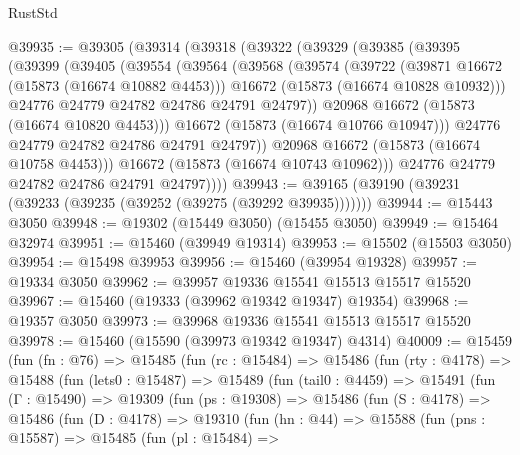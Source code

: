 \begin{lexlean}{RustStd}
\begin{coremodule}
@39935 := @39305
    (@39314
      (@39318
        (@39322
          (@39329
            (@39385
              (@39395
                (@39399
                  (@39405
                    (@39554
                      (@39564
                        (@39568
                          (@39574
                            (@39722
                              (@39871 @16672 (@15873 (@16674 @10882 @4453)))
                              @16672
                              (@15873 (@16674 @10828 @10932)))
                            @24776
                            @24779
                            @24782
                            @24786
                            @24791
                            @24797))
                        @20968
                        @16672
                        (@15873 (@16674 @10820 @4453)))
                      @16672
                      (@15873 (@16674 @10766 @10947)))
                    @24776
                    @24779
                    @24782
                    @24786
                    @24791
                    @24797))
                @20968
                @16672
                (@15873 (@16674 @10758 @4453)))
              @16672
              (@15873 (@16674 @10743 @10962)))
            @24776
            @24779
            @24782
            @24786
            @24791
            @24797))))
@39943 := @39165 (@39190 (@39231 (@39233 (@39235 (@39252 (@39275 (@39292 @39935)))))))
@39944 := @15443 @3050
@39948 := @19302 (@15449 @3050) (@15455 @3050)
@39949 := @15464 @32974
@39951 := @15460 (@39949 @19314)
@39953 := @15502 (@15503 @3050)
@39954 := @15498 @39953
@39956 := @15460 (@39954 @19328)
@39957 := @19334 @3050
@39962 := @39957 @19336 @15541 @15513 @15517 @15520
@39967 := @15460 (@19333 (@39962 @19342 @19347) @19354)
@39968 := @19357 @3050
@39973 := @39968 @19336 @15541 @15513 @15517 @15520
@39978 := @15460 (@15590 (@39973 @19342 @19347) @4314)
@40009 := @15459
    (fun (fn : @76) =>
    @15485
      (fun (rc : @15484) =>
      @15486
        (fun (rty : @4178) =>
        @15488
          (fun (lets0 : @15487) =>
          @15489
            (fun (tail0 : @4459) =>
            @15491
              (fun (Γ : @15490) =>
              @19309
                (fun (ps : @19308) =>
                @15486
                  (fun (S : @4178) =>
                  @15486
                    (fun (D : @4178) =>
                    @19310
                      (fun (hn : @44) =>
                      @15588
                        (fun (pns : @15587) =>
                        @15485
                          (fun (pl : @15484) =>

\end{coremodule}
\end{lexlean}
